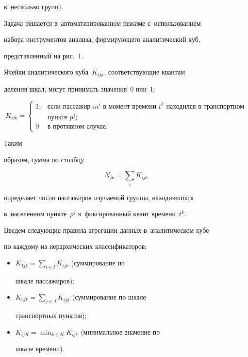 в~несколько групп).


      


      Задача решается в~автоматизированном режиме с~использованием 


набора инструментов анализа, фор\-ми\-ру\-юще\-го аналитический куб, 


представленный на рис.~1.


      








      Ячейки аналитического куба~$K_{ijk}$, соответствующие квантам 


деления шкал, могут принимать значения~0 или~1:


$$


K_{ijk}=\begin{cases}


1, & \mbox{если\ пассажир~$m^i$ в~момент\ времени~$t^k$ находился\ 


в~транспортном}\\


&\mbox{пункте~$p^j$};\\


0  & \mbox{в~противном случае.}


\end{cases}


$$


 Таким 


образом, сумма по столбцу


      $$


      N_{jk}=\sum\limits_i K_{ijk}


      $$


определяет число пассажиров изучаемой группы, находившихся 


в~населенном пункте~$p^j$ в~фиксированный квант времени~$t^k$.





      Введем следующие правила агрегации данных в~аналитическом кубе 


по каждому из иерархических классификаторов:


      \begin{itemize}


      \item $K_{Ijk}=\sum\nolimits_{i\in I} K_{ijk}$  (суммирование по 


шкале пассажиров);


\item $K_{iJk}=\sum\nolimits_{j\in J} K_{ijk}$ (суммирование по шкале 


транспортных пунктов);


\item $K_{ijK} =\min\nolimits_{k\in K} K_{ijk}$ (минимальное значение по 


шкале времени).


\end{itemize}


